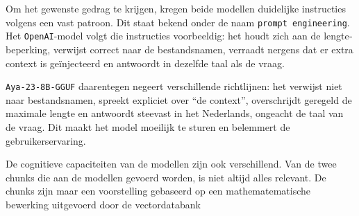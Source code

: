 Om het gewenste gedrag te krijgen, kregen beide modellen duidelijke instructies volgens een vast patroon. Dit staat bekend onder de naam \texttt{prompt engineering}. Het \texttt{OpenAI}-model volgt die instructies voorbeeldig: het houdt zich aan de lengte­beperking, verwijst correct naar de bestandsnamen, verraadt nergens dat er extra context is geïnjecteerd en antwoordt in dezelfde taal als de vraag.

\texttt{Aya-23-8B-GGUF} daarentegen negeert verschillende richtlijnen: het verwijst niet naar bestandsnamen, spreekt expliciet over ``de context'', overschrijdt geregeld de maximale lengte en antwoordt steevast in het Nederlands, ongeacht de taal van de vraag. Dit maakt het model moeilijk te sturen en belemmert de gebruikerservaring. 

De cognitieve capaciteiten van de modellen zijn ook verschillend. Van de twee chunks die aan de modellen gevoerd worden, is niet altijd alles relevant. De chunks zijn maar een voorstelling gebaseerd op een mathematematische bewerking uitgevoerd door de vectordatabank  
